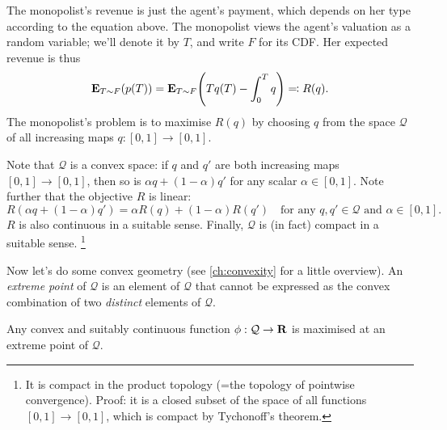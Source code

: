 The monopolist's revenue is just the agent's payment, which depends on her type according to the equation above.
The monopolist views the agent's valuation as a random variable; we'll denote it by $T$, and write $F$ for its CDF.
Her expected revenue is thus
%
\begin{equation*}
	\E_{T \sim F}( p(T) )
	= \E_{T \sim F}\left( T q(T) - \int_0^T q \right)
	\eqqcolon R(q) .
\end{equation*}
%
The monopolist's problem is to maximise $R(q)$
by choosing $q$ from the space $\mathcal{Q}$ of all increasing maps $q : [0,1] \to [0,1]$.

Note that $\mathcal{Q}$ is a convex space: if $q$ and $q'$ are both increasing maps $[0,1] \to [0,1]$, then so is $\alpha q + (1-\alpha) q'$ for any scalar $\alpha \in [0,1]$.
Note further that the objective $R$ is linear:
%
\begin{equation*}
	R( \alpha q + (1-\alpha) q' ) = \alpha R(q) + (1-\alpha) R(q') 
	\quad \text{for any $q,q' \in \mathcal{Q}$ and $\alpha \in [0,1]$.}
\end{equation*}
%
$R$ is also continuous in a suitable sense.
Finally, $\mathcal{Q}$ is (in fact) compact in a suitable sense.%
	\footnote{It is compact in the product topology (=the topology of pointwise convergence).
	Proof: it is a closed subset of the space of all functions $[0,1] \to [0,1]$, which is compact by Tychonoff's theorem.}

Now let's do some convex geometry (see \cref{ch:convexity} for a little overview).
An \emph{extreme point} of $\mathcal{Q}$ is an element of $\mathcal{Q}$ that cannot be expressed as the convex combination of two \emph{distinct} elements of $\mathcal{Q}$.

\begin{observation}
	\label{observation:bauer}
	Any convex and suitably continuous function $\phi : \mathcal{Q} \to \mathbf{R}$
	is maximised at an extreme point of $\mathcal{Q}$.
\end{observation}

